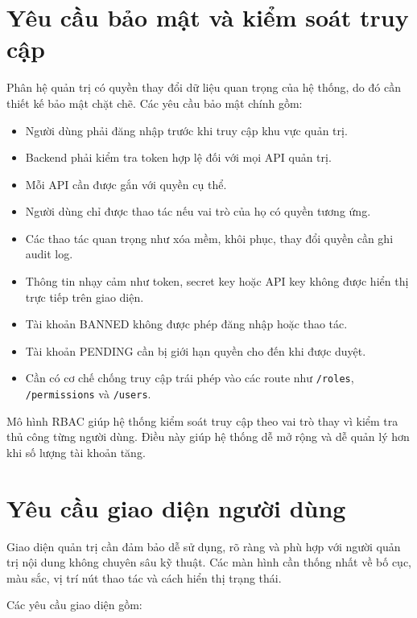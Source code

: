 \section{Yêu cầu bảo mật và kiểm soát truy cập}

Phân hệ quản trị có quyền thay đổi dữ liệu quan trọng của hệ thống, do đó cần thiết kế bảo mật chặt chẽ. Các yêu cầu bảo mật chính gồm:

\begin{itemize}
    \item Người dùng phải đăng nhập trước khi truy cập khu vực quản trị.
    \item Backend phải kiểm tra token hợp lệ đối với mọi API quản trị.
    \item Mỗi API cần được gắn với quyền cụ thể.
    \item Người dùng chỉ được thao tác nếu vai trò của họ có quyền tương ứng.
    \item Các thao tác quan trọng như xóa mềm, khôi phục, thay đổi quyền cần ghi audit log.
    \item Thông tin nhạy cảm như token, secret key hoặc API key không được hiển thị trực tiếp trên giao diện.
    \item Tài khoản BANNED không được phép đăng nhập hoặc thao tác.
    \item Tài khoản PENDING cần bị giới hạn quyền cho đến khi được duyệt.
    \item Cần có cơ chế chống truy cập trái phép vào các route như \texttt{/roles}, \texttt{/permissions} và \texttt{/users}.
\end{itemize}

Mô hình RBAC giúp hệ thống kiểm soát truy cập theo vai trò thay vì kiểm tra thủ công từng người dùng. Điều này giúp hệ thống dễ mở rộng và dễ quản lý hơn khi số lượng tài khoản tăng.

\section{Yêu cầu giao diện người dùng}

Giao diện quản trị cần đảm bảo dễ sử dụng, rõ ràng và phù hợp với người quản trị nội dung không chuyên sâu kỹ thuật. Các màn hình cần thống nhất về bố cục, màu sắc, vị trí nút thao tác và cách hiển thị trạng thái.

Các yêu cầu giao diện gồm:

